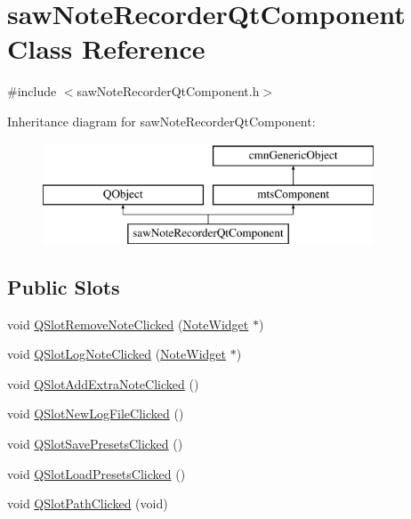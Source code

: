 \hypertarget{classsaw_note_recorder_qt_component}{\section{saw\-Note\-Recorder\-Qt\-Component Class Reference}
\label{classsaw_note_recorder_qt_component}
}


{\ttfamily \#include $<$saw\-Note\-Recorder\-Qt\-Component.\-h$>$}

Inheritance diagram for saw\-Note\-Recorder\-Qt\-Component\-:\begin{figure}[H]
\begin{center}
\leavevmode
\includegraphics[height=3.000000cm]{da/db1/classsaw_note_recorder_qt_component}
\end{center}
\end{figure}
\subsection*{Public Slots}
\begin{DoxyCompactItemize}
\item 
void \hyperlink{classsaw_note_recorder_qt_component_a113814071efb1495e85733937fd81bdd}{Q\-Slot\-Remove\-Note\-Clicked} (\hyperlink{class_note_widget}{Note\-Widget} $\ast$)
\item 
void \hyperlink{classsaw_note_recorder_qt_component_a2c404e747767ca50917e228d6b57fcaa}{Q\-Slot\-Log\-Note\-Clicked} (\hyperlink{class_note_widget}{Note\-Widget} $\ast$)
\item 
void \hyperlink{classsaw_note_recorder_qt_component_a71f17fb009688347d4c2c1b6e64a0007}{Q\-Slot\-Add\-Extra\-Note\-Clicked} ()
\item 
void \hyperlink{classsaw_note_recorder_qt_component_ad11411ae86a4e3ec47dd47a0ab4252a3}{Q\-Slot\-New\-Log\-File\-Clicked} ()
\item 
void \hyperlink{classsaw_note_recorder_qt_component_a7901ca9f2a13beb8244f1f539c75f7aa}{Q\-Slot\-Save\-Presets\-Clicked} ()
\item 
void \hyperlink{classsaw_note_recorder_qt_component_a75f01e5fdce86d58b0396103fa91c104}{Q\-Slot\-Load\-Presets\-Clicked} ()
\item 
void \hyperlink{classsaw_note_recorder_qt_component_a47448ba1acafc9910c5c8617278c15a4}{Q\-Slot\-Path\-Clicked} (void)
\end{DoxyCompactItemize}
